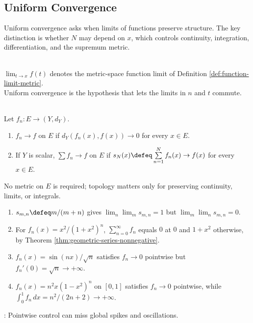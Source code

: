 \subsection{Uniform Convergence}

%


Uniform convergence asks when limits of functions preserve structure. The key distinction is whether $N$ may depend on $x$, which controls continuity, integration, differentiation, and the supremum metric.

\begin{perspective} \label{per:function-limits-before-function-sequences} \\
$\lim_{t\to x}f(t)$ denotes the metric-space function limit of Definition \ref{def:function-limit-metric}.\\
Uniform convergence is the hypothesis that lets the limits in $n$ and $t$ commute.
\end{perspective}

\begin{definition} \label{def:pointwise-convergence-functions} \\
Let $f_n:E\to(Y,d_Y)$.
\begin{enumerate}[label=(\roman*)]
\setlength{\itemsep}{0pt}
\item $f_n\to f$  on $E$ if $d_Y(f_n(x),f(x))\to0$ for every $x\in E$.
\item If $Y$ is scalar, $\sum f_n\to f$  on $E$ if $s_N(x)\defeq\sum\limits_{n=1}^{N}f_n(x)\to f(x)$ for every $x\in E$.
\end{enumerate}
No metric on $E$ is required; topology matters only for preserving continuity, limits, or integrals.
\end{definition}

\begin{example} \label{ex:pointwise-limits-do-not-preserve-structure} 
\begin{enumerate}[label=(\roman*)]
\setlength{\itemsep}{0pt}
\item $s_{m,n}\defeq m/(m+n)$ gives $\lim_n\lim_m s_{m,n}=1$ but $\lim_m\lim_n s_{m,n}=0$.
\item For $f_n(x)=x^2/(1+x^2)^n$, $\sum_{n=0}^{\infty}f_n$ equals $0$ at $0$ and $1+x^2$ otherwise, by Theorem \ref{thm:geometric-series-nonnegative}.
\item $f_n(x)=\sin(nx)/\sqrt n$ satisfies $f_n\to0$ pointwise but $f_n'(0)=\sqrt n\to+\infty$.
\item $f_n(x)=n^2x(1-x^2)^n$ on $[0,1]$ satisfies $f_n\to0$ pointwise, while $\int_0^1 f_n\,dx=n^2/(2n+2)\to+\infty$.
\end{enumerate}
: Pointwise control can miss global spikes and oscillations.
\end{example}

